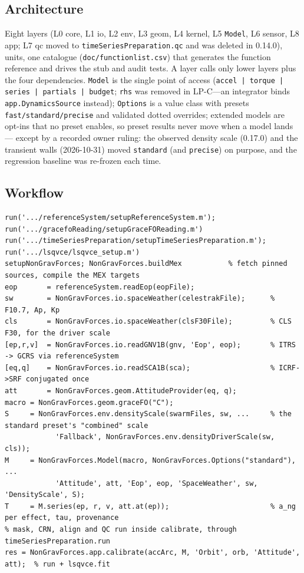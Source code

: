 \subsection{Architecture}
Eight layers (L0 core, L1 io, L2 env, L3 geom, L4 kernel, L5 \texttt{Model}, L6 sensor, L8 app; L7 qc moved to \texttt{timeSeriesPreparation.qc} and was deleted in 0.14.0), \ngfunitcount{} units, one catalogue (\texttt{doc/functionlist.csv}) that generates the function reference and drives the stub and audit tests. A layer calls only lower layers plus the four dependencies. \texttt{Model} is the single point of access (\texttt{accel | torque | series | partials | budget}; \texttt{rhs} was removed in LP-C---an integrator binds \texttt{app.DynamicsSource} instead); \texttt{Options} is a value class with presets \texttt{fast/standard/precise} and validated dotted overrides; extended models are opt-ins that no preset enables, so preset results never move when a model lands --- except by a recorded owner ruling: the observed density scale (0.17.0) and the transient walls (2026-10-31) moved \texttt{standard} (and \texttt{precise}) on purpose, and the regression baseline was re-frozen each time.

\subsection{Workflow}
\begin{lstlisting}
run('.../referenceSystem/setupReferenceSystem.m'); run('.../gracefoReading/setupGraceFOReading.m')
run('.../timeSeriesPreparation/setupTimeSeriesPreparation.m'); run('.../lsqvce/lsqvce_setup.m')
setupNonGravForces; NonGravForces.buildMex           % fetch pinned sources, compile the MEX targets
eop       = referenceSystem.readEop(eopFile);
sw        = NonGravForces.io.spaceWeather(celestrakFile);      % F10.7, Ap, Kp
cls       = NonGravForces.io.spaceWeather(clsF30File);         % CLS F30, for the driver scale
[ep,r,v]  = NonGravForces.io.readGNV1B(gnv, 'Eop', eop);       % ITRS -> GCRS via referenceSystem
[eq,q]    = NonGravForces.io.readSCA1B(sca);                   % ICRF->SRF conjugated once
att       = NonGravForces.geom.AttitudeProvider(eq, q);
macro = NonGravForces.geom.graceFO("C");
S     = NonGravForces.env.densityScale(swarmFiles, sw, ...     % the standard preset's "combined" scale
            'Fallback', NonGravForces.env.densityDriverScale(sw, cls));
M     = NonGravForces.Model(macro, NonGravForces.Options("standard"), ...
            'Attitude', att, 'Eop', eop, 'SpaceWeather', sw, 'DensityScale', S);
T     = M.series(ep, r, v, att.at(ep));                        % a_ng per effect, tau, provenance
% mask, CRN, align and QC run inside calibrate, through timeSeriesPreparation.run
res = NonGravForces.app.calibrate(accArc, M, 'Orbit', orb, 'Attitude', att);  % run + lsqvce.fit
\end{lstlisting}

